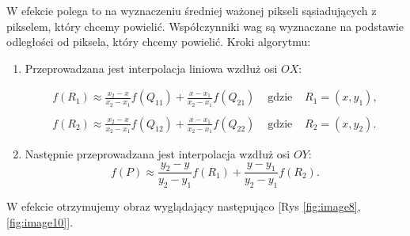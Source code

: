 W efekcie polega to na wyznaczeniu średniej ważonej pikseli sąsiadujących z pikselem, który chcemy powielić. Współczynniki wag są wyznaczane na podstawie odległości od piksela, który chcemy powielić.
Kroki algorytmu:
\begin{enumerate}
    \item Przeprowadzana jest interpolacja liniowa wzdłuż osi $O X$:
    
    $$
    \begin{array}{llll}
    f\left(R_1\right) \approx \frac{x_2-x}{x_2-x_1} f\left(Q_{11}\right)+\frac{x-x_1}{x_2-x_1} f\left(Q_{21}\right) & \text { gdzie } & R_1=\left(x, y_1\right), \\ \\
    f\left(R_2\right) \approx \frac{x_2-x}{x_2-x_1} f\left(Q_{12}\right)+\frac{x-x_1}{x_2-x_1} f\left(Q_{22}\right) & \text { gdzie } & R_2=\left(x, y_2\right) .
    \end{array}
    $$
    \item Następnie przeprowadzana jest interpolacja wzdłuż osi $O Y$:
    $$
    f(P) \approx \frac{y_2-y}{y_2-y_1} f\left(R_1\right)+\frac{y-y_1}{y_2-y_1} f\left(R_2\right) .
    $$
\end{enumerate}


W efekcie otrzymujemy obraz wyglądający następująco [Rys \ref{fig:image8},  \ref{fig:image10}].


